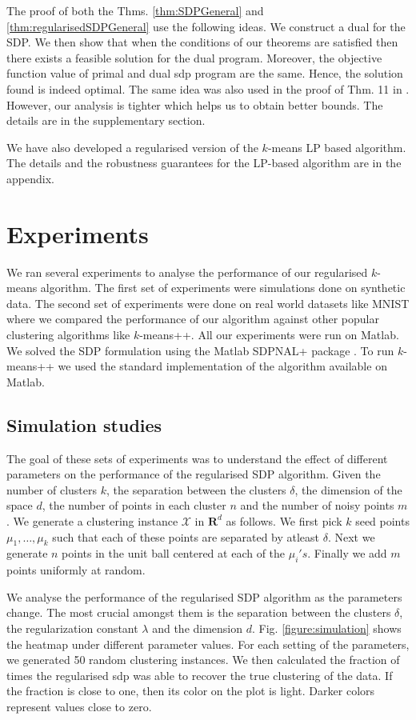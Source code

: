 \documentclass[12pt]{article}
\newcommand{\mc}{\mathcal}
\newcommand{\mb}{\mathbf}
\begin{document}
The proof of both the Thms. \ref{thm:SDPGeneral} and \ref{thm:regularisedSDPGeneral} use the following ideas. We construct a dual for the SDP. We then show that when the conditions of our theorems are satisfied then there exists a feasible solution for the dual program. Moreover, the objective function value of primal and dual sdp program are the same. Hence, the solution found is indeed optimal. The same idea was also used in the proof of Thm. 11 in \cite{awasthi2015relax}. However, our analysis is tighter which helps us to obtain better bounds. The details are in the supplementary section.

We have also developed a regularised version of the $k$-means LP based algorithm. The details and the robustness guarantees for the LP-based algorithm are in the appendix. 

\section{Experiments}
We ran several experiments to analyse the performance of our regularised $k$-means algorithm. The first set of experiments were simulations done on synthetic data. The second set of experiments were done on real world datasets like MNIST where we compared the performance of our algorithm against other popular clustering algorithms like $k$-means++. All our experiments were run on Matlab. We solved the SDP formulation using the Matlab SDPNAL+ package \cite{yang2015sdpnal+}. To run $k$-means++ we used the standard implementation of the algorithm available on Matlab.

\subsection{Simulation studies}
The goal of these sets of experiments was to understand the effect of different parameters on the performance of the regularised SDP algorithm. Given the number of clusters $k$, the separation between the clusters $\delta$, the dimension of the space $d$, the number of points in each cluster $n$ and the number of noisy points $m$. We generate a clustering instance $\mc X$ in $\mb R^d$ as follows. We first pick $k$ seed points $\mu_1, \ldots, \mu_k$ such that each of these points are separated by atleast $\delta$. Next we generate $n$ points in the unit ball centered at each of the $\mu_i's$. Finally we add $m$ points uniformly at random. 

We analyse the performance of the regularised SDP algorithm as the parameters change. The most crucial amongst them is the separation between the clusters $\delta$, the regularization constant $\lambda$ and the dimension $d$. Fig. \ref{figure:simulation} shows the heatmap under different parameter values. For each setting of the parameters, we generated 50 random clustering instances. We then calculated the fraction of times the regularised sdp was able to recover the true clustering of the data. If the fraction is close to one, then its color on the plot is light. Darker colors represent values close to zero.
\end{document}
